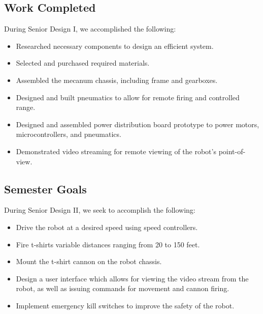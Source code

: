 \documentclass[letterpaper,12pt]{article}
\begin{document}
\subsection{Work Completed}
During Senior Design I, we accomplished the following:
\begin{itemize}
\item Researched necessary components to design an efficient system.
\item Selected and purchased required materials.
\item Assembled the mecanum chassis, including frame and gearboxes.
\item Designed and built pneumatics to allow for remote firing and controlled range.
\item Designed and assembled power distribution board prototype to power motors, microcontrollers, and pneumatics.
\item Demonstrated video streaming for remote viewing of the robot's point-of-view.
\end{itemize}

\subsection{Semester Goals}
During Senior Design II, we seek to accomplish the following:
\begin{itemize}
\item Drive the robot at a desired speed using speed controllers.
\item Fire t-shirts variable distances ranging from 20 to 150 feet.
\item Mount the t-shirt cannon on the robot chassis.
\item Design a user interface which allows for viewing the video stream from the robot, as well as issuing commands for movement and cannon firing.
\item Implement emergency kill switches to improve the safety of the robot.
\end{itemize}
\end{document}
